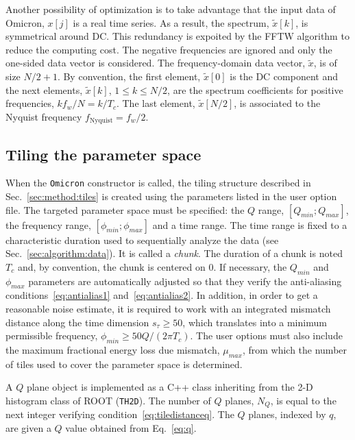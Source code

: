 Another possibility of optimization is to take advantage that the input data of Omicron, $x[j]$ is a real time series. As a result, the spectrum, $\tilde{x}[k]$, is symmetrical around DC. This redundancy is expoited by the FFTW algorithm to reduce the computing cost. The negative frequencies are ignored and only the one-sided data vector is considered. The frequency-domain data vector, $\tilde{x}$, is of size $N/2+1$. By convention, the first element, $\tilde{x}[0]$ is the DC component and the next elements, $\tilde{x}[k]$, $1\le k \le N/2$, are the spectrum coefficients for positive frequencies, $kf_w/N=k/T_c$. The last element, $\tilde{x}[N/2]$, is associated to the Nyquist frequency $f_{\text{Nyquist}}=f_w/2$. 

\subsection{Tiling the parameter space} \label{sec:algorithm:tiling}

When the \texttt{Omicron} constructor is called, the tiling structure described in Sec.~\ref{sec:method:tiles} is created using the parameters listed in the user option file. The targeted parameter space must be specified: the $Q$ range, $[Q_{min}; Q_{max}]$, the frequency range, $[\phi_{min}; \phi_{max}]$ and a time range. The time range is fixed to a characteristic duration used to sequentially analyze the data (see Sec.~\ref{sec:algorithm:data}). It is called a \textit{chunk}. The duration of a chunk is noted $T_c$ and, by convention, the chunk is centered on 0. If necessary, the $Q_{min}$ and $\phi_{max}$ parameters are automatically adjusted so that they verify the anti-aliasing conditions~\ref{eq:antialias1} and~\ref{eq:antialias2}. In addition, in order to get a reasonable noise estimate, it is required to work with an integrated mismatch distance along the time dimension $s_\tau\ge50$, which translates into a minimum permissible frequency, $\phi_{min} \ge 50Q/(2\pi T_c)$.
The user options must also include the maximum fractional energy loss due mismatch, $\mu_{max}$, from which the number of tiles used to cover the parameter space is determined.

A $Q$ plane object is implemented as a C++ class inheriting from the 2-D histogram class of ROOT (\texttt{TH2D}). The number of $Q$ planes, $N_Q$, is equal to the next integer verifying condition~\ref{eq:tiledistanceq}. The $Q$ planes, indexed by $q$, are given a $Q$ value obtained from Eq.~\ref{eq:q}.

